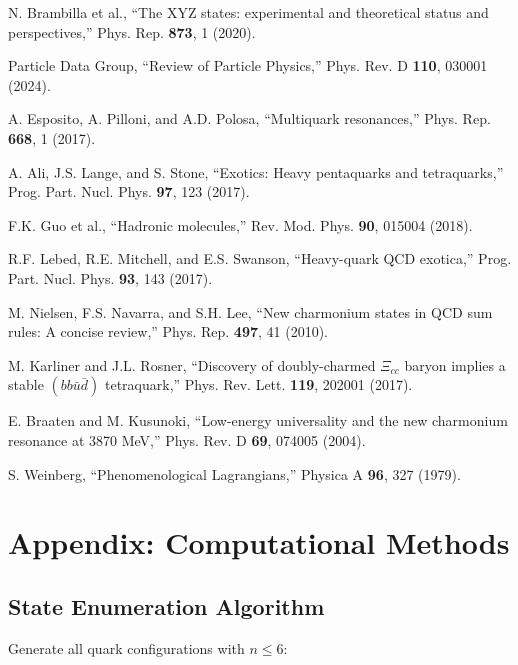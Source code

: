 \documentclass[12pt,a4paper]{article}
\begin{document}
\begin{thebibliography}{99}
N. Brambilla et al.,
``The XYZ states: experimental and theoretical status and perspectives,''
Phys. Rep. \textbf{873}, 1 (2020).

Particle Data Group,
``Review of Particle Physics,''
Phys. Rev. D \textbf{110}, 030001 (2024).

A. Esposito, A. Pilloni, and A.D. Polosa,
``Multiquark resonances,''
Phys. Rep. \textbf{668}, 1 (2017).

A. Ali, J.S. Lange, and S. Stone,
``Exotics: Heavy pentaquarks and tetraquarks,''
Prog. Part. Nucl. Phys. \textbf{97}, 123 (2017).

F.K. Guo et al.,
``Hadronic molecules,''
Rev. Mod. Phys. \textbf{90}, 015004 (2018).

R.F. Lebed, R.E. Mitchell, and E.S. Swanson,
``Heavy-quark QCD exotica,''
Prog. Part. Nucl. Phys. \textbf{93}, 143 (2017).

M. Nielsen, F.S. Navarra, and S.H. Lee,
``New charmonium states in QCD sum rules: A concise review,''
Phys. Rep. \textbf{497}, 41 (2010).

M. Karliner and J.L. Rosner,
``Discovery of doubly-charmed $\Xi_{cc}$ baryon implies a stable $(bb\bar{u}\bar{d})$ tetraquark,''
Phys. Rev. Lett. \textbf{119}, 202001 (2017).

E. Braaten and M. Kusunoki,
``Low-energy universality and the new charmonium resonance at 3870 MeV,''
Phys. Rev. D \textbf{69}, 074005 (2004).

S. Weinberg,
``Phenomenological Lagrangians,''
Physica A \textbf{96}, 327 (1979).

\end{thebibliography}

\appendix

\section{Appendix: Computational Methods}

\subsection{State Enumeration Algorithm}

Generate all quark configurations with $n \leq 6$:
\end{document}
